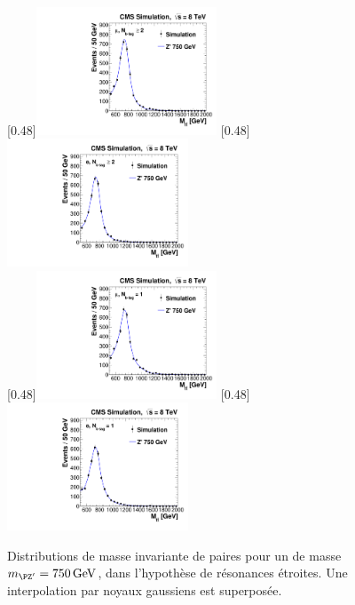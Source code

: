 \begin{figure}[tbp] \centering
    [0.48\textwidth]{\includegraphics[width=0.48\textwidth,angle=-90,origin=c]{chapitre7/figs/signal/signal_zprime_750_mu_2b.pdf}} \hfill
    [0.48\textwidth]{\includegraphics[width=0.48\textwidth,angle=-90,origin=c]{chapitre7/figs/signal/signal_zprime_750_e_2b.pdf}} \\
    [0.48\textwidth]{\includegraphics[width=0.48\textwidth,angle=-90,origin=c]{chapitre7/figs/signal/signal_zprime_750_mu_1b.pdf}} \hfill
    [0.48\textwidth]{\includegraphics[width=0.48\textwidth,angle=-90,origin=c]{chapitre7/figs/signal/signal_zprime_750_e_1b.pdf}}
    \caption{Distributions de masse invariante de paires \ttbar pour un \zprime de masse $\mzp = \SI{750}{\GeV}$, dans l'hypothèse de résonances étroites. Une interpolation par noyaux gaussiens est superposée.}
    \label{fig:signal_pdf}
\end{figure}

